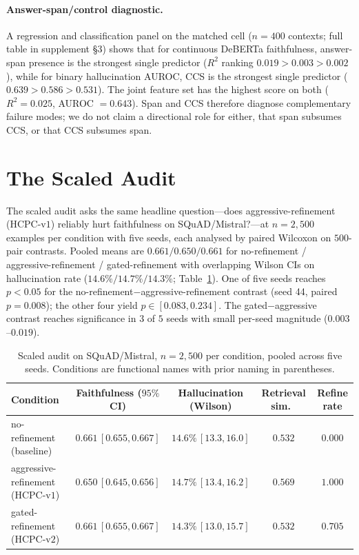 \paragraph{Answer-span/control diagnostic.} A regression and
classification panel on the matched cell ($n=400$ contexts; full table
in supplement \S 3) shows that for continuous DeBERTa faithfulness,
answer-span presence is the strongest single predictor ($R^2$ ranking
$0.019 > 0.003 > 0.002$), while for binary hallucination AUROC, CCS is
the strongest single predictor ($0.639 > 0.586 > 0.531$). The joint
feature set has the highest score on both ($R^2 = 0.025$, AUROC
$= 0.643$). Span and CCS therefore diagnose complementary failure
modes; we do not claim a directional role for either, that span
subsumes CCS, or that CCS subsumes span.

\section{The Scaled Audit}
\label{sec:scaling}

The scaled audit asks the same headline question---does
aggressive-refinement (HCPC-v$1$) reliably hurt faithfulness on
SQuAD/Mistral?---at $n=2{,}500$ examples per condition with five
seeds, each analysed by paired Wilcoxon on $500$-pair contrasts.
Pooled means are $0.661 / 0.650 / 0.661$ for no-refinement /
aggressive-refinement / gated-refinement with overlapping Wilson CIs
on hallucination rate ($14.6\% / 14.7\% / 14.3\%$;
Table~\ref{tab:scaling_main}). One of five seeds reaches $p<0.05$
for the no-refinement$-$aggressive-refinement contrast (seed 44,
paired $p=0.008$); the other four yield $p \in [0.083, 0.234]$. The
gated$-$aggressive contrast reaches significance in $3$ of $5$ seeds
with small per-seed magnitude ($0.003$--$0.019$).

\begin{table}[!htb]
\centering
\caption{Scaled audit on SQuAD/Mistral, $n=2{,}500$ per condition,
pooled across five seeds. Conditions are functional names with prior
naming in parentheses.}
\label{tab:scaling_main}
\footnotesize
\begin{tabular}{lcccc}
\toprule
Condition & Faithfulness ($95\%$ CI) & Hallucination (Wilson) & Retrieval sim.\ & Refine rate \\
\midrule
no-refinement (baseline)        & $0.661 \, [0.655, 0.667]$ & $14.6\% \, [13.3, 16.0]$ & $0.532$ & $0.000$ \\
aggressive-refinement (HCPC-v$1$) & $0.650 \, [0.645, 0.656]$ & $14.7\% \, [13.4, 16.2]$ & $0.569$ & $1.000$ \\
gated-refinement (HCPC-v$2$)    & $0.661 \, [0.655, 0.667]$ & $14.3\% \, [13.0, 15.7]$ & $0.532$ & $0.705$ \\
\bottomrule
\end{tabular}
\end{table}

